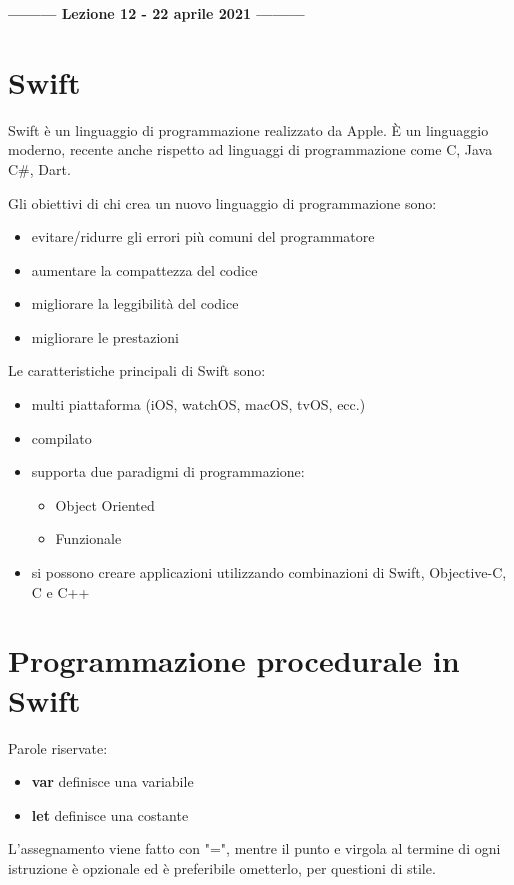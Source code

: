 \begin{center}
    \textbf{--------- Lezione 12 - 22 aprile 2021 ---------}
\end{center}

\section{Swift}
Swift è un linguaggio di programmazione realizzato da Apple.
È un linguaggio moderno, recente anche rispetto ad linguaggi di programmazione come C, Java C\#, Dart.

Gli obiettivi di chi crea un nuovo linguaggio di programmazione sono:
\begin{itemize}
    \item evitare/ridurre gli errori più comuni del programmatore
    \item aumentare la compattezza del codice
    \item migliorare la leggibilità del codice
    \item migliorare le prestazioni
\end{itemize}

Le caratteristiche principali di Swift sono:
\begin{itemize}
    \item multi piattaforma (iOS, watchOS, macOS, tvOS, ecc.)
    \item compilato
    \item supporta due paradigmi di programmazione: 
    \begin{itemize}
        \item Object Oriented
        \item Funzionale
    \end{itemize}
    \item si possono creare applicazioni utilizzando combinazioni di Swift, Objective-C, C e C++
\end{itemize}

\section{Programmazione procedurale in Swift}
Parole riservate:
\begin{itemize}
    \item \textbf{var} definisce una variabile
    \item \textbf{let} definisce una costante
\end{itemize}
L'assegnamento viene fatto con "=", mentre il punto e virgola al termine di ogni istruzione è opzionale ed è preferibile ometterlo, per questioni di stile.

